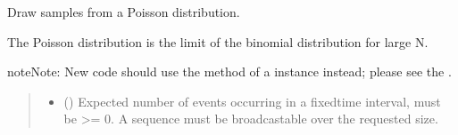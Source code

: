 \documentclass[letterpaper,10pt,english]{sphinxmanual}
\begin{document}
\begin{fulllineitems}
\label{\detokenize{metilda.controllers:metilda.controllers.pitch_art_wizard.pointProcessGetNumPoints}}
\pysigstartsignatures
{}
\pysigstopsignatures
\end{fulllineitems}


\begin{fulllineitems}
\label{\detokenize{metilda.controllers:metilda.controllers.pitch_art_wizard.poisson}}
\pysigstartsignatures
{}
\pysigstopsignatures
\sphinxAtStartPar
Draw samples from a Poisson distribution.

\sphinxAtStartPar
The Poisson distribution is the limit of the binomial distribution
for large N.

\begin{sphinxadmonition}{note}{Note:}
\sphinxAtStartPar
New code should use the 
method of a  instance instead;
please see the .
\end{sphinxadmonition}
\begin{quote}\begin{description}
\begin{itemize}
\item {} 
\sphinxAtStartPar
{} () \textendash{} Expected number of events occurring in a fixed\sphinxhyphen{}time interval,
must be \textgreater{}= 0. A sequence must be broadcastable over the requested
size.


\end{itemize}
\end{description}
\end{quote}
\end{fulllineitems}
\end{document}
